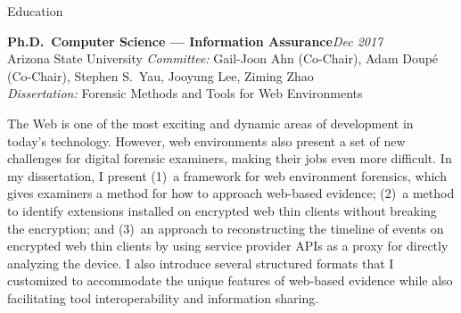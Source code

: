 

\begin{rSection}{Education}

\textbf{Ph.D.\ Computer Science --- Information Assurance}\hfill \emph{Dec 2017}\\
Arizona State University \hfill %
\iftoggle{fullAddress}{{1151 S Forest Ave \#140, Tempe, AZ 85281}\\}{{Tempe, AZ}\\}
\textit{Committee:} Gail-Joon Ahn (Co-Chair), Adam Doup\'{e} (Co-Chair), Stephen S.\ Yau, Jooyung Lee, Ziming Zhao\\
\textit{Dissertation:} Forensic Methods and Tools for Web Environments
\begin{CVonly}\begin{quoting}

  The Web is one of the most exciting and dynamic areas of development in today's technology. However, web environments
  also present a set of new challenges for digital forensic examiners, making their jobs even more difficult. In my
  dissertation, I present (1)~a framework for web environment forensics, which gives examiners a method for how to
  approach web-based evidence; (2)~a method to identify extensions installed on encrypted web thin clients without
  breaking the encryption; and (3)~an approach to reconstructing the timeline of events on encrypted web thin clients by
  using service provider APIs as a proxy for directly analyzing the device. I also introduce several structured formats
  that I customized to accommodate the unique features of web-based evidence while also facilitating tool
  interoperability and information sharing.

\end{quoting}\end{CVonly}


\end{rSection}

